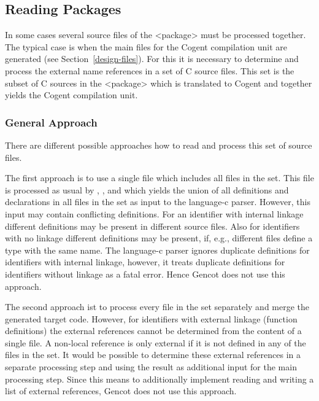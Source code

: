 \subsection{Reading Packages}
\label{impl-ccode-package}

In some cases several source files of the <package> must be processed together. The typical case is when the main
files for the Cogent compilation unit are generated (see Section~\ref{design-files}). For this it is necessary 
to determine and process the external name references in a set of
C source files. This set is the subset of C sources in the <package> which is translated to Cogent and together yields
the Cogent compilation unit. 

\subsubsection{General Approach}

There are different possible approaches how to read and process this set of source files.

The first approach is to use a single file which includes all files in the set. This file is processed as usual by
, , and  which yields the union of all definitions
and declarations in all files in the set as input to the language-c parser. However, this input may contain conflicting
definitions. For an identifier with internal linkage different definitions may be present in different source files.
Also for identifiers with no linkage different definitions may be present, if, e.g., different  files define
a type with the same name. The language-c parser ignores duplicate definitions for identifiers with internal linkage,
however, it treats duplicate definitions for identifiers without linkage as a fatal error. Hence Gencot does not use
this approach.

The second approach ist to process every file in the set separately and merge the generated target code. However, for
identifiers with external linkage (function definitions) the external references cannot be determined from the content
of a single file. A non-local reference is only external if it is not defined in any of the files in the set. It would
be possible to determine these external references in a separate processing step and using the result as additional input
for the main processing step. Since this means to additionally implement reading and writing a list of external references,
Gencot does not use this approach.

